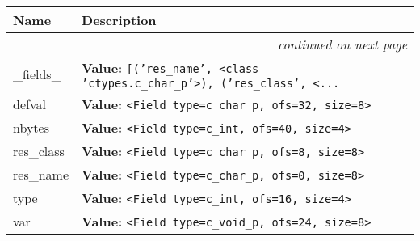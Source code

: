     \vspace{-1cm}
\hspace{\varindent}\begin{longtable}{|p{\varnamewidth}|p{\vardescrwidth}|l}
\cline{1-2}
\cline{1-2} \centering \textbf{Name} & \centering \textbf{Description}& \\
\cline{1-2}
\endhead\cline{1-2}\multicolumn{3}{r}{\small\textit{continued on next page}}\\\endfoot\cline{1-2}
\endlastfoot\raggedright \_\-f\-i\-e\-l\-d\-s\-\_\- & \raggedright \textbf{Value:} 
{\tt \texttt{[}\texttt{(}\texttt{'}\texttt{res\_name}\texttt{'}\texttt{, }{\textless}class 'ctypes.c\_char\_p'{\textgreater}\texttt{)}\texttt{, }\texttt{(}\texttt{'}\texttt{res\_class}\texttt{'}\texttt{, }{\textless}\texttt{...}}&\\
\cline{1-2}
\raggedright d\-e\-f\-v\-a\-l\- & \raggedright \textbf{Value:} 
{\tt {\textless}Field type=c\_char\_p, ofs=32, size=8{\textgreater}}&\\
\cline{1-2}
\raggedright n\-b\-y\-t\-e\-s\- & \raggedright \textbf{Value:} 
{\tt {\textless}Field type=c\_int, ofs=40, size=4{\textgreater}}&\\
\cline{1-2}
\raggedright r\-e\-s\-\_\-c\-l\-a\-s\-s\- & \raggedright \textbf{Value:} 
{\tt {\textless}Field type=c\_char\_p, ofs=8, size=8{\textgreater}}&\\
\cline{1-2}
\raggedright r\-e\-s\-\_\-n\-a\-m\-e\- & \raggedright \textbf{Value:} 
{\tt {\textless}Field type=c\_char\_p, ofs=0, size=8{\textgreater}}&\\
\cline{1-2}
\raggedright t\-y\-p\-e\- & \raggedright \textbf{Value:} 
{\tt {\textless}Field type=c\_int, ofs=16, size=4{\textgreater}}&\\
\cline{1-2}
\raggedright v\-a\-r\- & \raggedright \textbf{Value:} 
{\tt {\textless}Field type=c\_void\_p, ofs=24, size=8{\textgreater}}&\\
\cline{1-2}
\end{longtable}




